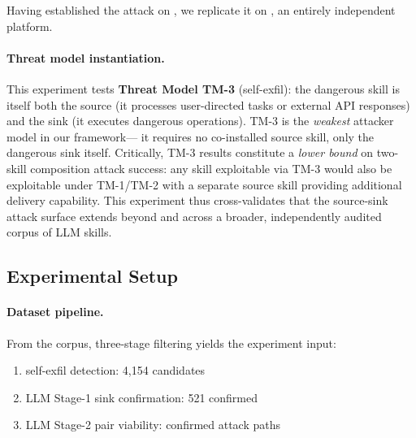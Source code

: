
Having established the attack on \clawhub, we replicate it on
\skillssh{}, an entirely independent platform.

\paragraph{Threat model instantiation.}
This experiment tests \textbf{Threat Model TM-3} (self-exfil):
the dangerous skill is itself both the source (it processes user-directed tasks
or external API responses) and the sink (it executes dangerous operations).
TM-3 is the \emph{weakest} attacker model in our framework---
it requires no co-installed source skill, only the dangerous sink itself.
Critically, TM-3 results constitute a \emph{lower bound} on two-skill
composition attack success: any skill exploitable via TM-3 would also
be exploitable under TM-1/TM-2 with a separate source skill providing
additional delivery capability.
This experiment thus cross-validates that the source-sink attack surface
extends beyond \clawhub and across a broader, independently audited
corpus of LLM skills.


\subsection{Experimental Setup}

\paragraph{Dataset pipeline.}
From the \NskillsSH{} \skillssh{} corpus, three-stage filtering yields
the experiment input:
\begin{enumerate}[leftmargin=*,topsep=2pt,itemsep=2pt]
  \item \lscps self-exfil detection: 4,154 candidates
  \item LLM Stage-1 sink confirmation: 521 confirmed
  \item LLM Stage-2 pair viability: \NpairsSS{} confirmed attack paths
\end{enumerate}

